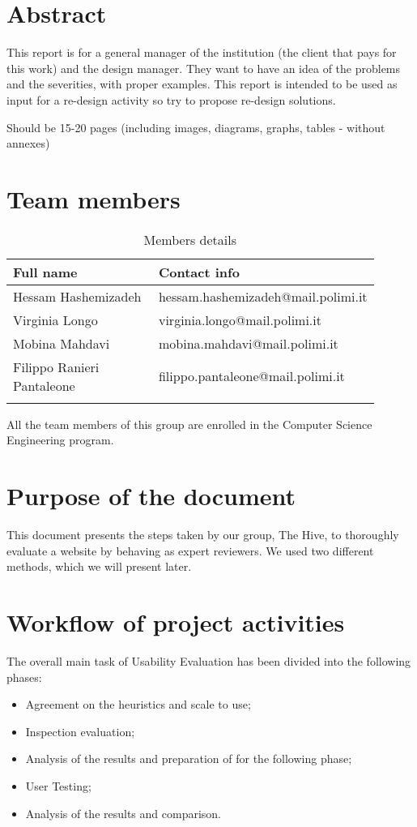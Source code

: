 \section{Abstract}
This report is for a general manager of the institution (the client that pays for this work) and the design manager. They want to have an idea of the problems and the severities, with proper examples.
This report is intended to be used as input for a re-design activity so try to propose re-design solutions.

Should be 15-20 pages (including images, diagrams, graphs, tables - without annexes)


\section{Team members}
\begin{longtable}
    {|m{0.4\linewidth}|m{0.5\linewidth}|}
            \hline
            \textbf{Full name} & \textbf{Contact info}\\
            \hline
            \endhead
                Hessam Hashemizadeh & hessam.hashemizadeh@mail.polimi.it \\
            \hline
                Virginia Longo & virginia.longo@mail.polimi.it \\
            \hline
                Mobina Mahdavi & mobina.mahdavi@mail.polimi.it \\
            \hline
                Filippo Ranieri Pantaleone & filippo.pantaleone@mail.polimi.it \\
            \hline
            \caption{Members details}
            \label{table:mem_details}
\end{longtable}

All the team members of this group are enrolled in the Computer Science Engineering program.

\section{Purpose of the document}
This document presents the steps taken by our group, The Hive, to thoroughly evaluate a website by behaving as expert reviewers. We used two different methods, which we will present later.


\section{Workflow of project activities}
The overall main task of Usability Evaluation has been divided into the following phases:

\begin{itemize}
	\item Agreement on the heuristics and scale to use;
	\item Inspection evaluation;
	\item Analysis of the results and preparation of for the following phase;
	\item User Testing;
	\item Analysis of the results and comparison.
\end{itemize}
